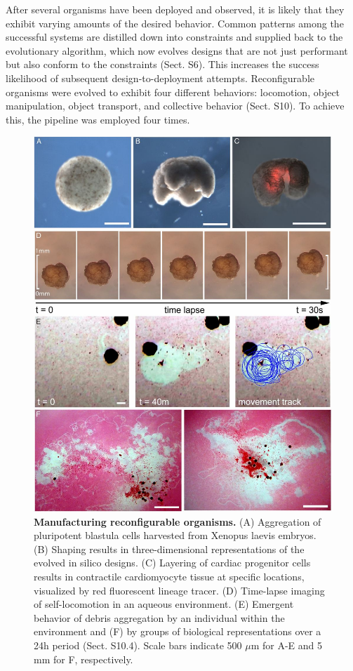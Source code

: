 After several organisms have been deployed and observed, it is likely that they exhibit varying amounts of the desired behavior. Common patterns among the successful systems are distilled down into constraints and supplied back to the evolutionary algorithm, which now evolves designs that are not just performant but also conform to the constraints (Sect. S6). This increases the success likelihood of subsequent design-to-deployment attempts.
Reconfigurable organisms were evolved to exhibit four different behaviors: locomotion, object manipulation, object transport, and collective behavior (Sect. S10). To achieve this, the pipeline was employed four times. 





\begin{figure}[!ht]
\centering
\includegraphics[width=0.857\linewidth]{Chapter07/img/F3.large.jpg}
\caption{\textbf{Manufacturing reconfigurable organisms.} (A) Aggregation of pluripotent blastula cells harvested from Xenopus laevis embryos. (B) Shaping results in three-dimensional representations of the evolved in silico designs. (C) Layering of cardiac progenitor cells results in contractile cardiomyocyte tissue at specific locations, visualized by red fluorescent lineage tracer. (D) Time-lapse imaging of self-locomotion in an aqueous environment. (E) Emergent behavior of debris aggregation by an individual within the environment and (F) by groups of biological representations over a 24h period (Sect. S10.4). Scale bars indicate 500 {$\mu$}m for A-E and 5 mm for F, respectively.}
\end{figure}




